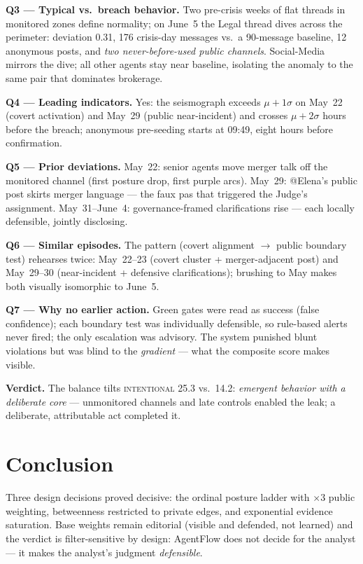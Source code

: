 \documentclass{vgtc}                %
\begin{document}
\textbf{Q3 --- Typical vs.\ breach behavior.} Two pre-crisis weeks of
flat threads in monitored zones define normality; on June~5 the Legal
thread dives across the perimeter: deviation 0.31, 176 crisis-day
messages vs.\ a 90-message baseline, 12 anonymous posts, and \emph{two
never-before-used public channels}. Social-Media mirrors the dive; all
other agents stay near baseline, isolating the anomaly to the same
pair that dominates brokerage.

\textbf{Q4 --- Leading indicators.} Yes: the seismograph exceeds
$\mu{+}1\sigma$ on May~22 (covert activation) and May~29 (public
near-incident) and crosses $\mu{+}2\sigma$ hours before the breach;
anonymous pre-seeding starts at 09:49, eight hours before
confirmation.

\textbf{Q5 --- Prior deviations.} May~22: senior agents move merger
talk off the monitored channel (first posture drop, first purple
arcs). May~29: @Elena's public post skirts merger language --- the
faux pas that triggered the Judge's assignment. May~31--June~4:
governance-framed clarifications rise --- each locally defensible,
jointly disclosing.

\textbf{Q6 --- Similar episodes.} The pattern (covert alignment $\to$
public boundary test) rehearses twice: May~22--23 (covert cluster +
merger-adjacent post) and May~29--30 (near-incident + defensive
clarifications); brushing to May makes both visually isomorphic to
June~5.

\textbf{Q7 --- Why no earlier action.} Green gates were read as
success (false confidence); each boundary test was individually
defensible, so rule-based alerts never fired; the only escalation was
advisory. The system punished blunt violations but was blind to the
\emph{gradient} --- what the composite score makes visible.

\textbf{Verdict.} The balance tilts \textsc{intentional} 25.3 vs.\
14.2: \emph{emergent behavior with a deliberate core} --- unmonitored
channels and late controls enabled the leak; a deliberate,
attributable act completed it.

\section{Conclusion}

Three design decisions proved decisive: the ordinal posture ladder
with $\times 3$ public weighting, betweenness restricted to private
edges, and exponential evidence saturation. Base weights remain
editorial (visible and defended, not learned) and the verdict is
filter-sensitive by design: AgentFlow does not decide for the analyst
--- it makes the analyst's judgment \emph{defensible}.
\end{document}
